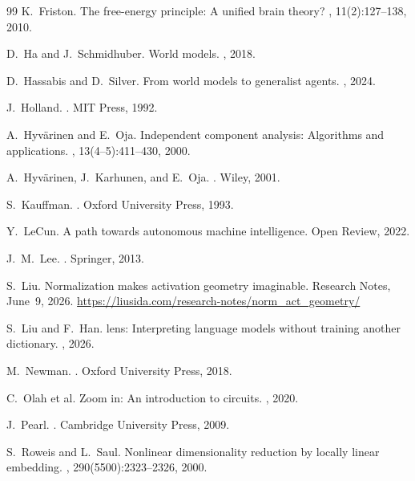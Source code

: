 \documentclass[12pt, a4paper]{article}
\theoremstyle{plain}
\theoremstyle{definition}
\theoremstyle{remark}
\begin{document}
\begin{thebibliography}{99}
K.~Friston.
\newblock The free-energy principle: A unified brain theory?
, 11(2):127--138, 2010.

D.~Ha and J.~Schmidhuber.
\newblock World models.
, 2018.

D.~Hassabis and D.~Silver.
\newblock From world models to generalist agents.
, 2024.

J.~Holland.
.
\newblock MIT Press, 1992.

A.~Hyv\"{a}rinen and E.~Oja.
\newblock Independent component analysis: Algorithms and applications.
, 13(4--5):411--430, 2000.

A.~Hyv\"{a}rinen, J.~Karhunen, and E.~Oja.
.
\newblock Wiley, 2001.

S.~Kauffman.
.
\newblock Oxford University Press, 1993.

Y.~LeCun.
\newblock A path towards autonomous machine intelligence.
\newblock Open Review, 2022.

J.~M.~Lee.
.
\newblock Springer, 2013.

S.~Liu.
\newblock Normalization makes activation geometry imaginable.
\newblock Research Notes, June~9, 2026.
\newblock \url{https://liusida.com/research-notes/norm_act_geometry/}

S.~Liu and F.~Han.
 lens: Interpreting language models without training another
  dictionary.
, 2026.

M.~Newman.
.
\newblock Oxford University Press, 2018.

C.~Olah et al.
\newblock Zoom in: An introduction to circuits.
, 2020.

J.~Pearl.
.
\newblock Cambridge University Press, 2009.

S.~Roweis and L.~Saul.
\newblock Nonlinear dimensionality reduction by locally linear embedding.
, 290(5500):2323--2326, 2000.


\end{thebibliography}
\end{document}
